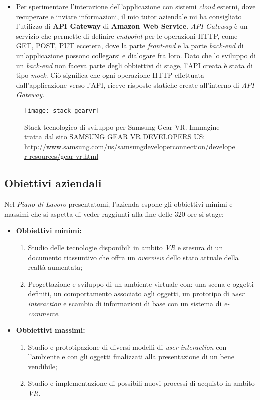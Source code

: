 \begin{itemize}
	\item Per sperimentare l'interazione dell'applicazione con sistemi \textit{cloud} esterni, dove recuperare e inviare informazioni, il mio tutor aziendale mi ha consigliato l'utilizzo di \textbf{API Gateway} di \textbf{Amazon Web Service}. \textit{API Gateway} è un servizio che permette di definire \textit{endpoint} per le operazioni HTTP, come GET, POST, PUT eccetera, dove la parte \textit{front-end} e la parte \textit{back-end} di un'applicazione possono collegarsi e dialogare fra loro. Dato che lo sviluppo di un \textit{back-end} non faceva parte degli obbiettivi di stage, l'API creata è stata di tipo \textit{mock}. Ciò significa che ogni operazione HTTP effettuata dall'applicazione verso l'API, riceve risposte statiche create all'interno di \textit{API Gateway}. 
\end{itemize}

\label{Stack Gear VR}
\begin{figure}[ht]
	\begin{center}
		\texttt{[image: stack-gearvr]}
		\caption{Stack tecnologico di sviluppo per Samsung Gear VR. Immagine tratta dal sito SAMSUNG GEAR VR DEVELOPERS US: \url{http://www.samsung.com/us/samsungdeveloperconnection/developer-resources/gear-vr.html}}
	\end{center}
\end{figure}
\FloatBarrier

\subsection{Obiettivi aziendali}

Nel \textit{Piano di Lavoro} presentatomi, l'azienda espone gli obbiettivi minimi e massimi che si aspetta di veder raggiunti alla fine delle 320 ore si stage:

\begin{itemize}
	\item \textbf{Obbiettivi minimi:}
	\begin{enumerate}
		\item Studio delle tecnologie disponibili in ambito \textit{VR} e stesura di un documento riassuntivo che offra un \textit{overview} dello stato attuale della realtà aumentata;
		\item Progettazione e sviluppo di un ambiente virtuale con: una scena e oggetti definiti, un comportamento associato agli oggetti, un prototipo di \textit{user interaction} e scambio di informazioni di base con un sistema di \textit{e-commerce}.
	\end{enumerate}
	\item \textbf{Obbiettivi massimi:}
	\begin{enumerate}
		\item Studio e prototipazione di diversi modelli di \textit{user interaction} con l'ambiente e con gli oggetti finalizzati alla presentazione di un bene vendibile;
		\item Studio e implementazione di possibili nuovi processi di acquisto in ambito \textit{VR}. 
	\end{enumerate}
\end{itemize}

